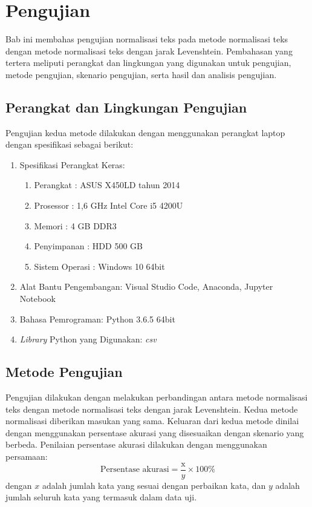 \chapter{Pengujian}

Bab ini membahas pengujian normalisasi teks pada metode normalisasi teks \parencite{saragih2017normalisasi} dengan metode normalisasi teks dengan jarak Levenshtein. Pembahasan yang tertera meliputi perangkat dan lingkungan yang digunakan untuk pengujian, metode pengujian, skenario pengujian, serta hasil dan analisis pengujian.

\section{Perangkat dan Lingkungan Pengujian}

Pengujian kedua metode dilakukan dengan menggunakan perangkat laptop dengan spesifikasi sebagai berikut:
\begin{enumerate}
    \item Spesifikasi Perangkat Keras:
    \begin{enumerate}
        \setlength{\itemsep}{1pt}
        \item Perangkat \tab \tab : ASUS X450LD tahun 2014
        \item Prosessor \tab \tab : 1,6 GHz Intel Core i5 4200U
        \item Memori \tab \tab : 4 GB DDR3
        \item Penyimpanan \tab : HDD 500 GB
        \item Sistem Operasi \tab : Windows 10 64bit
    \end{enumerate}
    \item Alat Bantu Pengembangan: Visual Studio Code, Anaconda, Jupyter Notebook
    \item Bahasa Pemrograman: Python 3.6.5 64bit
    \item \textit{Library} Python yang Digunakan: \textit{csv} \parencite{pythoncsv}
\end{enumerate}

\section{Metode Pengujian}

Pengujian dilakukan dengan melakukan perbandingan antara metode normalisasi teks \parencite{saragih2017normalisasi} dengan metode normalisasi teks dengan jarak Levenshtein. Kedua metode normalisasi diberikan masukan yang sama. Keluaran dari kedua metode dinilai dengan menggunakan persentase akurasi yang disesuaikan dengan skenario yang berbeda. Penilaian persentase akurasi dilakukan dengan menggunakan persamaan:
\begin{equation*}
	\text{Persentase akurasi}=\frac{\text{x}}{y} \times 100\%
\end{equation*}
\noindent
dengan $x$ adalah jumlah kata yang sesuai dengan perbaikan kata, dan $y$ adalah jumlah seluruh kata yang termasuk dalam data uji.

